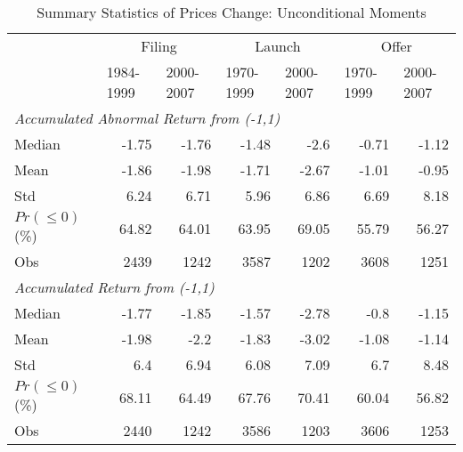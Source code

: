\documentclass[11pt]{article}
\begin{document}
\begin{table}[htbp]
	\centering
	\caption{Summary Statistics of Prices Change: Unconditional Moments}
	\begin{tabular}{lrrrrrr}
		\toprule
		& \multicolumn{2}{c}{Filing} & \multicolumn{2}{c}{Launch} & \multicolumn{2}{c}{Offer} \\
		& \multicolumn{1}{l}{1984-1999} & \multicolumn{1}{l}{2000-2007} & \multicolumn{1}{l}{1970-1999} & \multicolumn{1}{l}{2000-2007} & \multicolumn{1}{l}{1970-1999} & \multicolumn{1}{l}{2000-2007} \\
		\midrule
		\multicolumn{7}{l}{\textit{Accumulated Abnormal Return from (-1,1)}}\\
		Median & -1.75 & -1.76 & -1.48 & -2.6  & -0.71 & -1.12 \\
		Mean  & -1.86 & -1.98 & -1.71 & -2.67 & -1.01 & -0.95 \\
		Std   & 6.24  & 6.71  & 5.96  & 6.86  & 6.69  & 8.18 \\
		$ Pr(\leq 0) $ (\%) & 64.82 & 64.01 & 63.95 & 69.05 & 55.79 & 56.27 \\
		Obs   & 2439  & 1242  & 3587  & 1202  & 3608  & 1251 \\
		\midrule
		\multicolumn{7}{l}{\textit{Accumulated Return from (-1,1)}} \\
		Median & -1.77 & -1.85 & -1.57 & -2.78 & -0.8  & -1.15 \\
		Mean  & -1.98 & -2.2  & -1.83 & -3.02 & -1.08 & -1.14 \\
		Std   & 6.4   & 6.94  & 6.08  & 7.09  & 6.7   & 8.48 \\
		$ Pr(\leq 0) $ (\%) & 68.11 & 64.49 & 67.76 & 70.41 & 60.04 & 56.82 \\
		Obs   & 2440  & 1242  & 3586  & 1203  & 3606  & 1253\\
		\bottomrule
	\end{tabular}%
	\label{tab:addlabel}%
\end{table}%
\end{document}
